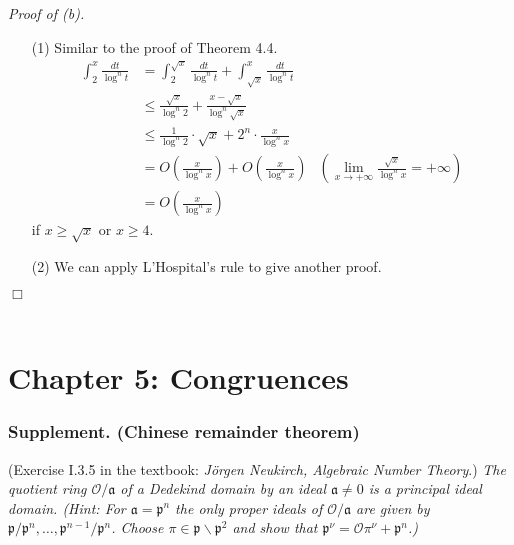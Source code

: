 \documentclass{article}
\begin{document}
\emph{Proof of (b).}
\begin{enumerate}
\item[(1)]
  Similar to the proof of Theorem 4.4.
  \begin{align*}
    \int_{2}^{x} \frac{dt}{\log^n t}
    &= \int_{2}^{\sqrt{x}} \frac{dt}{\log^n t} + \int_{\sqrt{x}}^{x} \frac{dt}{\log^n t} \\
    &\leq \frac{\sqrt{x}}{\log^n 2} + \frac{x - \sqrt{x}}{\log^n \sqrt{x}} \\
    &\leq \frac{1}{\log^n 2} \cdot \sqrt{x} + 2^n \cdot \frac{x}{\log^n x} \\
    &= O\left( \frac{x}{\log^{n} x} \right) + O\left( \frac{x}{\log^{n} x} \right)
      &\left(\text{$\lim_{x \to +\infty} \frac{\sqrt{x}}{\log^{n} x} = +\infty$}\right) \\
    &= O\left( \frac{x}{\log^{n} x} \right)
  \end{align*}
  if $x \geq \sqrt{x}$ or $x \geq 4$.

\item[(2)]
  We can apply L'Hospital's rule to give another proof.
\end{enumerate}
$\Box$ \\\\






\newpage
\section*{Chapter 5: Congruences \\}



\subsubsection*{Supplement. (Chinese remainder theorem)}
(Exercise I.3.5 in the textbook: \emph{J\"orgen Neukirch, Algebraic Number Theory}.)
\emph{The quotient ring $\mathcal{O}/\mathfrak{a}$ of a Dedekind domain by
an ideal $\mathfrak{a} \neq 0$ is a principal ideal domain.
(Hint: For $\mathfrak{a} = \mathfrak{p}^n$ the only proper ideals of $\mathcal{O}/\mathfrak{a}$
are given by $\mathfrak{p}/\mathfrak{p}^n, \ldots, \mathfrak{p}^{n-1}/\mathfrak{p}^n$.
Choose $\pi \in \mathfrak{p} \smallsetminus \mathfrak{p}^2$
and show that $\mathfrak{p}^{\nu} = \mathcal{O}\pi^{\nu} + \mathfrak{p}^n$.)} \\
\end{document}
